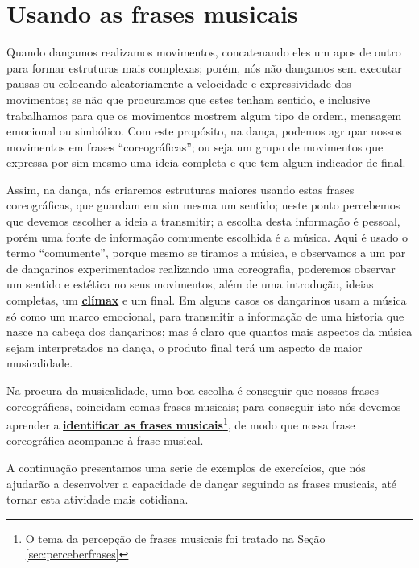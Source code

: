 
\section{Usando as frases musicais}
Quando dançamos realizamos movimentos, 
concatenando eles um apos de outro para formar estruturas mais complexas;
porém, nós não dançamos sem executar pausas ou colocando aleatoriamente a velocidade 
e expressividade dos movimentos; 
se não que procuramos que estes tenham sentido, 
e inclusive trabalhamos para que os movimentos mostrem algum tipo de ordem, mensagem emocional ou simbólico.
Com este propósito, na dança, podemos agrupar nossos movimentos em frases ``coreográficas'';
ou seja um grupo de movimentos que expressa por sim mesmo uma ideia completa 
e que tem algum indicador de final. 

Assim, na dança, 
nós criaremos estruturas maiores usando estas frases coreográficas, 
que guardam em sim mesma um sentido; 
neste ponto percebemos que devemos escolher a ideia a transmitir;
a escolha desta informação é pessoal, porém uma fonte de informação comumente escolhida é a música.
Aqui é usado o termo ``comumente'', porque mesmo se tiramos a música, 
e observamos a um par de dançarinos experimentados realizando uma coreografia, 
poderemos observar um sentido e estética no seus movimentos,
além de uma introdução, ideias completas, um \hyperref[ref:climax]{\textbf{clímax}}  e um final.
Em alguns casos os dançarinos usam a música só como um marco emocional,
para transmitir a informação de uma historia que nasce na cabeça dos dançarinos;
mas é claro que quantos mais aspectos da música sejam interpretados na dança,
o produto final terá um aspecto de maior musicalidade.

Na procura da musicalidade, uma boa escolha é conseguir que nossas frases coreográficas,
coincidam comas frases musicais;
para conseguir isto nós devemos aprender a 
\hyperref[sec:perceberfrases]{\textbf{identificar as frases musicais}}\footnote{O 
tema da percepção de frases musicais foi tratado na Seção \ref{sec:perceberfrases}},
de modo que  nossa frase coreográfica acompanhe à frase musical.

A continuação presentamos uma serie de exemplos de exercícios, 
que nós ajudarão a desenvolver a capacidade de dançar seguindo as frases musicais,
até tornar esta atividade mais cotidiana.


